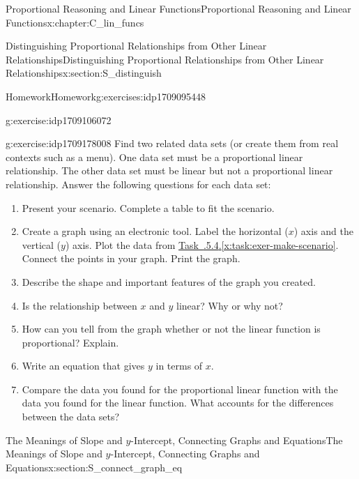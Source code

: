 \documentclass[oneside,10pt,]{book}
\newcommand{\xreffont}{\relax}
\newlength{\fillinmaxwidth}
\newlength{\fillincontract}
\newlength{\fillinheight}
\newcommand{\fillintext}[1]{%
\setlength{\fillinmaxwidth}{#1em*\real{0.5}}%
\setlength{\fillincontract}{#1em*\real{0.5}*\real{0.2}}%
\setlength{\fillinheight}{\heightof{\strut}+1.2pt}%
\strut\nobreak\leaders\vbox{\hrule width 0.3pt height 0.3pt \vskip -1.2pt}\hskip 1\fillinmaxwidth minus \fillincontract\nobreak\strut%
}
\numberwithin{equation}{chapter}
\begin{document}
\begin{chapterptx}{Proportional Reasoning and Linear Functions}{}{Proportional Reasoning and Linear Functions}{}{}{x:chapter:C_lin_funcs}
\begin{sectionptx}{Distinguishing Proportional Relationships from Other Linear Relationships}{}{Distinguishing Proportional Relationships from Other Linear Relationships}{}{}{x:section:S_distinguish}
\begin{exercises-subsection}{Homework}{}{Homework}{}{}{g:exercises:idp1709095448}
\begin{divisionexercise}{3}{}{}{g:exercise:idp1709106072}
\begin{enumerate}[font=\bfseries,label=(\alph*),ref=\alph*]
\end{enumerate}
\end{divisionexercise}%
\begin{divisionexercise}{4}{}{}{g:exercise:idp1709178008}%
Find two related data sets (or create them from real contexts such as a menu). One data set must be a proportional linear relationship. The other data set must be linear but not a proportional linear relationship. Answer the following questions for each data set:%
\begin{enumerate}[font=\bfseries,label=(\alph*),ref=\alph*]
\item\label{x:task:exer-make-scenario}Present your scenario. Complete a table to fit the scenario.%
\item{}Create a graph using an electronic tool. Label the horizontal (\(x\)) axis and the vertical (\(y\)) axis. Plot the data from \hyperref[x:task:exer-make-scenario]{Task~{\xreffont 2.6.5.4}.{\xreffont\ref{x:task:exer-make-scenario}}}. Connect the points in your graph. Print the graph.%
\item{}Describe the shape and important features of the graph you created.%
\item{}Is the relationship between \(x\) and \(y\) linear? Why or why not?%
\item{}How can you tell from the graph whether or not the linear function is proportional? Explain.%
\item{}Write an equation that gives \(y\) in terms of \(x\).%
\item{}Compare the data you found for the proportional linear function with the data you found for the linear function. What accounts for the differences between the data sets?%
\end{enumerate}
\end{divisionexercise}%
\end{exercises-subsection}
\end{sectionptx}
%
%
\typeout{************************************************}
\typeout{************************************************}
%
\begin{sectionptx}{The Meanings of Slope and \(y\)-Intercept, Connecting Graphs and Equations}{}{The Meanings of Slope and \(y\)-Intercept, Connecting Graphs and Equations}{}{}{x:section:S_connect_graph_eq}
%
%
\typeout{************************************************}

\end{sectionptx}
\end{chapterptx}
\end{document}
